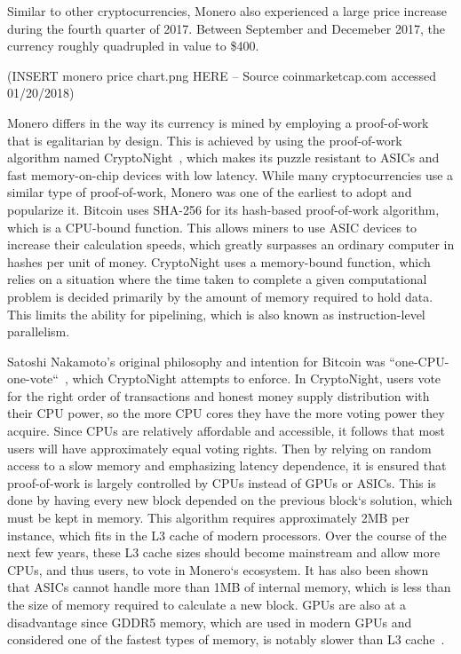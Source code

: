 Similar to other cryptocurrencies, Monero also experienced a large price increase during the fourth quarter of 2017. Between September and Decemeber 2017, the currency roughly quadrupled in value to \$400.

(INSERT monero price chart.png HERE -- Source coinmarketcap.com accessed 01/20/2018)

Monero differs in the way its currency is mined by employing a proof-of-work that is egalitarian by design. This is achieved by using the proof-of-work algorithm named CryptoNight~\cite{cryptoknight}, which makes its puzzle resistant to ASICs and fast memory-on-chip devices with low latency. While many cryptocurrencies use a similar type of proof-of-work, Monero was one of the earliest to adopt and popularize it.
Bitcoin uses SHA-256 for its hash-based proof-of-work algorithm, which is a CPU-bound function. This allows miners to use ASIC devices to increase their calculation speeds, which greatly surpasses an ordinary computer in hashes per unit of money. CryptoNight uses a memory-bound function, which relies on a situation where the time taken to complete a given computational problem is decided primarily by the amount of memory required to hold data. This limits the ability for pipelining, which is also known as instruction-level parallelism.  

Satoshi Nakamoto's original philosophy and intention for Bitcoin was ``one-CPU-one-vote``~\cite{nakamoto2008bitcoin}, which CryptoNight attempts to enforce. In CryptoNight, users vote for the right order of transactions and honest money supply distribution with their CPU power, so the more CPU cores they have the more voting power they acquire. Since CPUs are relatively affordable and accessible, it follows that most users will have approximately equal voting rights. Then by relying on random access to a slow memory and emphasizing latency dependence, it is ensured that proof-of-work is largely controlled by CPUs instead of GPUs or ASICs. This is done by having every new block depended on the previous block`s solution, which must be kept in memory. This algorithm requires approximately 2MB per instance, which fits in the L3 cache of modern processors. Over the course of the next few years, these L3 cache sizes should become mainstream and allow more CPUs, and thus users, to vote in Monero`s ecosystem. It has also been shown that ASICs cannot handle more than 1MB of internal memory, which is less than the size of memory required to calculate a new block. GPUs are also at a disadvantage since GDDR5 memory, which are used in modern GPUs and considered one of the fastest types of memory, is notably slower than L3 cache~\cite{van2013cryptonote}.  


